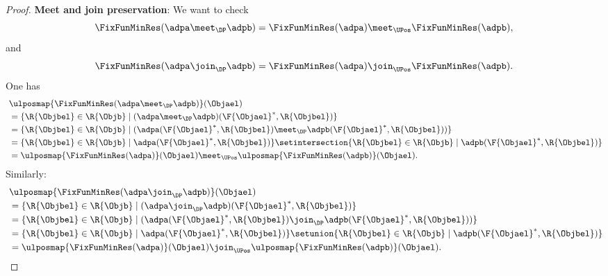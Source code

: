 \begin{proof}
	\textbf{Meet and join preservation}:
	We want to check
	\begin{equation*}
		\FixFunMinRes(\adpa \meet_\DP \adpb)=\FixFunMinRes(\adpa) \meet_\UPos \FixFunMinRes(\adpb),
	\end{equation*}
	and
	\begin{equation*}
		\FixFunMinRes(\adpa \join_\DP \adpb)=\FixFunMinRes(\adpa) \join_\UPos \FixFunMinRes(\adpb).
	\end{equation*}
	One has
	\begin{equation*}
		\begin{aligned}
			~ &
			\ulposmap{\FixFunMinRes(\adpa \meet_\DP \adpb)}(\Objael)                                                                                                         \\
			  & =\{ \R{\Objbel} \in \R{\Objb} \mid (\adpa \meet_\DP \adpb)(\F{\Objael}^*,\R{\Objbel})\}                                                                      \\
			  & =\{ \R{\Objbel} \in \R{\Objb} \mid (\adpa(\F{\Objael}^*,\R{\Objbel})\meet_\DP \adpb(\F{\Objael}^*,\R{\Objbel}))\}                                            \\
			  & =\{ \R{\Objbel} \in \R{\Objb} \mid \adpa(\F{\Objael}^*,\R{\Objbel})\} \setintersection \{ \R{\Objbel} \in \R{\Objb} \mid  \adpb(\F{\Objael}^*,\R{\Objbel})\} \\
			  & =\ulposmap{\FixFunMinRes(\adpa)}(\Objael) \meet_\UPos \ulposmap{\FixFunMinRes(\adpb)}(\Objael).
		\end{aligned}
	\end{equation*}
	Similarly:
	\begin{equation*}
		\begin{aligned}
			~ & \ulposmap{\FixFunMinRes(\adpa \join_\DP \adpb)}(\Objael)                                                                                              \\
			  & =\{ \R{\Objbel} \in \R{\Objb} \mid (\adpa \join_\DP \adpb)(\F{\Objael}^*,\R{\Objbel})\}                                                               \\
			  & =\{ \R{\Objbel} \in \R{\Objb} \mid (\adpa(\F{\Objael}^*,\R{\Objbel})\join_\DP \adpb(\F{\Objael}^*,\R{\Objbel}))\}                                     \\
			  & =\{ \R{\Objbel} \in \R{\Objb} \mid \adpa(\F{\Objael}^*,\R{\Objbel})\} \setunion \{ \R{\Objbel} \in \R{\Objb} \mid  \adpb(\F{\Objael}^*,\R{\Objbel})\} \\
			  & =\ulposmap{\FixFunMinRes(\adpa)}(\Objael) \join_\UPos \ulposmap{\FixFunMinRes(\adpb)}(\Objael).
		\end{aligned}
	\end{equation*}


\end{proof}
